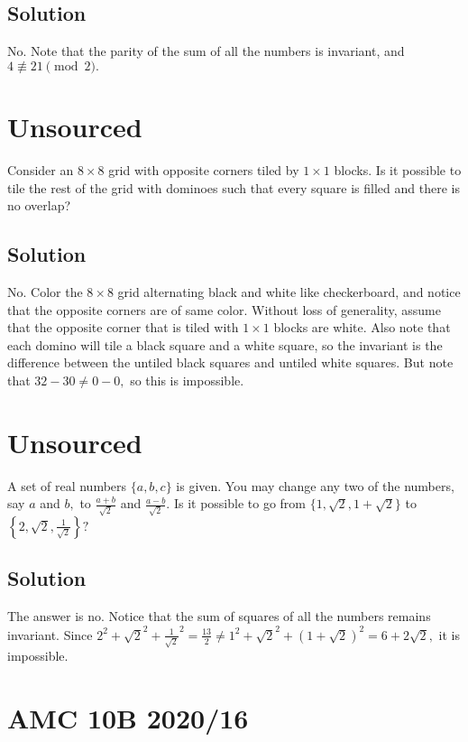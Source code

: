 \documentclass[mast]{lucky}
\begin{document}
\subsection{Solution}

No. Note that the parity of the sum of all the numbers is invariant, and $4\not\equiv21\pmod{2}.$

\pagebreak\section{Unsourced}

Consider an $8\times 8$ grid with opposite corners tiled by $1\times 1$ blocks. Is it possible to tile the rest of the grid with dominoes such that every square is filled and there is no overlap?

\subsection{Solution}

No. Color the $8\times 8$ grid alternating black and white like checkerboard, and notice that the opposite corners are of same color. Without loss of generality, assume that the opposite corner that is tiled with $1\times 1$ blocks are white. Also note that each domino will tile a black square and a white square, so the invariant is the difference between the untiled black squares and untiled white squares. But note that $32-30\neq 0-0,$ so this is impossible.

\pagebreak\section{Unsourced}

A set of real numbers $\{a, b, c\}$ is given. You may change any two of the numbers, say $a$ and $b,$ to $\frac{a+b}{\sqrt{2}}$ and $\frac{a-b}{\sqrt{2}} .$ Is it possible to go from $\{1, \sqrt{2}, 1+\sqrt{2}\}$ to $\left\{2, \sqrt{2}, \frac{1}{\sqrt{2}}\right\} ?$

\subsection{Solution}

The answer is no. Notice that the sum of squares of all the numbers remains invariant. Since $2^2+ \sqrt{2}^2 + \frac{1}{\sqrt{2}}^2 = \frac{13}{2} \neq 1^2 + \sqrt{2}^2 + \left(1+\sqrt{2}\right)^2 = 6+2\sqrt{2},$ it is impossible.

\pagebreak\section{AMC 10B 2020/16}
\end{document}
